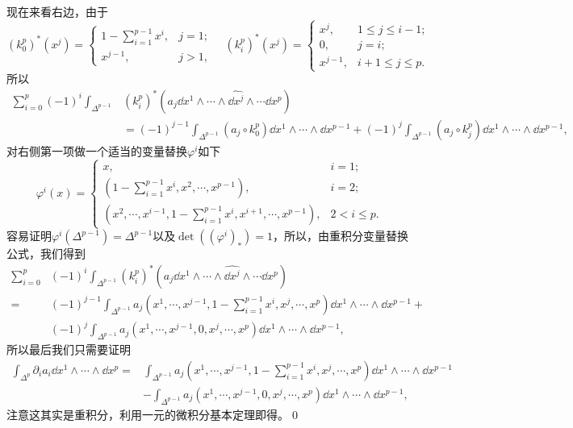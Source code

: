 现在来看右边，由于
\[(k^p_0)^*(x^j)=
\begin{cases}
	1-\sum_{i=1}^{p-1}x^i,& j =1;\\
	x^{j-1},& j>1,
\end{cases}\quad
(k^p_i)^*(x^j)=
\begin{cases}
	x^j,& 1\leq j \leq i-1;\\
	0,& j=i;\\
	x^{j-1},& i+1\leq j \leq p.
\end{cases}
\]
所以
\[
\begin{split}
	\sum_{i=0}^p(-1)^i\int_{\Delta^{p-1}}& (k^p_i)^*(a_j\dd x^1\wedge\cdots\wedge\widehat{\dd x^j}\wedge\cdots \dd x^p)\\
	&=(-1)^{j-1}\int_{\Delta^{p-1}} (a_j\circ k^p_0)\dd x^1\wedge\cdots \wedge\dd x^{p-1}+(-1)^j\int_{\Delta^{p-1}} (a_j\circ k_j^p)\dd x^1\wedge\cdots \wedge\dd x^{p-1},
\end{split}
\]
对右侧第一项做一个适当的变量替换$\varphi^i$如下
\[
	\varphi^i(x)=
	\begin{cases}
	x,& i=1;\\
	(1-\sum_{i=1}^{p-1}x^i,x^2,\cdots,x^{p-1}),& i=2;\\
	(x^2,\cdots,x^{i-1},1-\sum_{i=1}^{p-1}x^i,x^{i+1},\cdots,x^{p-1}),& 2<i\leq p.
\end{cases}
\]
容易证明$\varphi^i(\Delta^{p-1})=\Delta^{p-1}$以及$\det ((\varphi^i)_*)=1$，所以，由重积分变量替换公式，我们得到
\[
\begin{split}
	\sum_{i=0}^p&(-1)^i\int_{\Delta^{p-1}} (k^p_i)^*(a_j\dd x^1\wedge\cdots\wedge\widehat{\dd x^j}\wedge\cdots \dd x^p)\\
	=&(-1)^{j-1}\int_{\Delta^{p-1}} a_j\left(x^1,\cdots,x^{j-1},1-\sum_{i=1}^{p-1}x^i,x^{j},\cdots,x^p\right)\dd x^1\wedge\cdots \wedge\dd x^{p-1}+\\
	&(-1)^{j}\int_{\Delta^{p-1}}a_j(x^1,\cdots,x^{j-1},0,x^{j},\cdots,x^p)\dd x^1\wedge\cdots \wedge\dd x^{p-1},
\end{split}
\]
所以最后我们只需要证明
\[
\begin{split}
	\int_{\Delta^{p}}\partial_i a_i\dd x^1\wedge\cdots \wedge\dd x^p=
	&\int_{\Delta^{p-1}} a_j\left(x^1,\cdots,x^{j-1},1-\sum_{i=1}^{p-1}x^i,x^{j},\cdots,x^p\right)\dd x^1\wedge\cdots \wedge\dd x^{p-1}\\
	&-\int_{\Delta^{p-1}}a_j(x^1,\cdots,x^{j-1},0,x^{j},\cdots,x^p)\dd x^1\wedge\cdots \wedge\dd x^{p-1},
\end{split}
\]
注意这其实是重积分，利用一元的微积分基本定理即得。\qed

